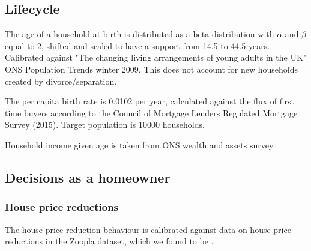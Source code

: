 \documentclass{article}
\begin{document}
\subsection{Lifecycle}
The age of a household at birth is distributed as a beta distribution with $\alpha$ and $\beta$ equal to 2, shifted and scaled to have a support from 14.5 to 44.5 years. Calibrated against "The changing living arrangements of young adults in the UK" ONS Population Trends winter 2009. This does not account for new households created by divorce/separation.

The per capita birth rate is 0.0102 per year, calculated against the flux of first time buyers according to the Council of Mortgage Lenders Regulated Mortgage Survey (2015). Target population is 10000 households.

Household income given age is taken from ONS wealth and assets survey. 

\subsection{Decisions as a homeowner}
\subsubsection{House price reductions}
The house price reduction behaviour is calibrated against data on house price reductions in the Zoopla dataset, which we found to be .
\end{document}
